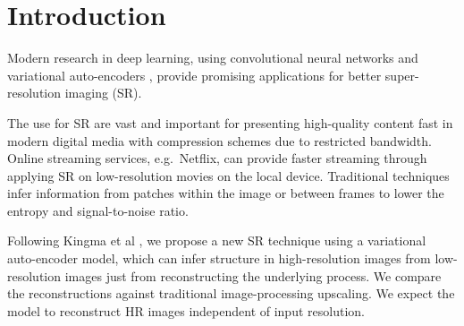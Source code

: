 \section{Introduction}
\label{sec:introduction}
Modern research in deep learning, using convolutional neural networks \cite{Dong15} and variational auto-encoders \cite{Kingma2013, Johnson16}, provide promising applications for better super-resolution imaging (SR).  

The use for SR are vast and important for presenting high-quality content fast in modern digital media with compression schemes due to restricted bandwidth. Online streaming services, e.g.\ Netflix, can provide faster streaming through applying SR on low-resolution movies on the local device. Traditional techniques infer information from patches within the image or between frames to lower the entropy and signal-to-noise ratio. 

Following Kingma et al \cite{Kingma2013}, we propose a new SR technique using a variational auto-encoder model, which can infer structure in high-resolution images from low-resolution images just from reconstructing the underlying process. We compare the reconstructions against traditional image-processing upscaling. We expect the model to reconstruct HR images independent of input resolution.  
